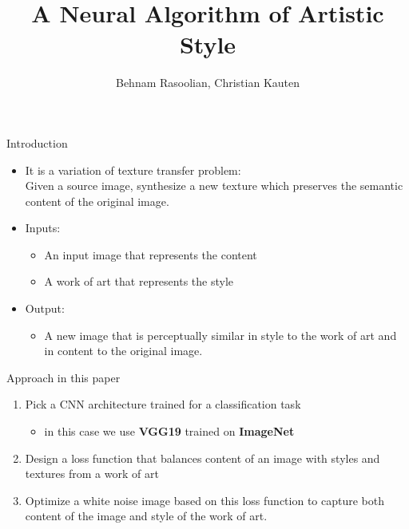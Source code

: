 \documentclass{beamer}
\title{A Neural Algorithm of Artistic Style \\ { \tiny \citeA{gatys2016image}}}
\author{Behnam Rasoolian, Christian Kauten}
\institute{Auburn University}
\date{}
\begin{document}

\frame{\titlepage}
\begin{frame}{Introduction}
    \begin{itemize}
    \item[] It is a variation of texture transfer problem:\\
    Given a source image, synthesize a new texture which preserves the
    semantic content of the original image.
    \item[] Inputs:
        \begin{itemize}
            \item An input image that represents the content
            \item A work of art that represents the style
        \end{itemize}
    \item[] Output:
        \begin{itemize}
            \item A new image that is perceptually similar in style to
            the work of art and in content to the original image.
        \end{itemize}
    \end{itemize}
\end{frame}

\begin{frame}{Approach in this paper}
    \begin{enumerate}
        \item Pick a CNN architecture trained for a classification task
        \begin{itemize}
            \item in this case we use \textbf{VGG19} trained on
                \textbf{ImageNet}
        \end{itemize}
        \item Design a loss function that balances content of an image with
            styles and textures from a work of art
        \item Optimize a white noise image based on this loss function to
            capture both content of the image and style of the work of art.
    \end{enumerate}
\end{frame}
\end{document}
